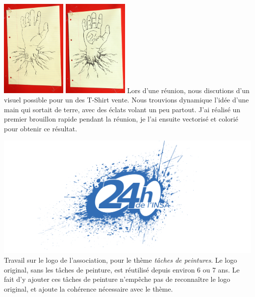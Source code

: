 \begin{center}
                \includegraphics[width=0.24\textwidth]{img/IMG_5792.JPG}
                \includegraphics[width=0.24\textwidth]{img/IMG_5848.JPG}
                Lors d'une réunion, nous discutions d'un visuel possible pour un des T-Shirt vente. Nous trouvions dynamique l'idée d'une main qui sortait de terre, avec des éclats volant un peu partout.
                J'ai réalisé un premier brouillon rapide pendant la réunion, je l'ai ensuite vectorisé et colorié pour obtenir ce résultat.
            \end{center}
            
            \begin{center}                     
                \includegraphics[width=\textwidth]{img/splash24.png}
                Travail sur le logo de l'association, pour le thème \textit{tâches de peintures}.
                Le logo original, sans les tâches de peinture, est réutilisé depuis environ 6 ou 7 ans.
                Le fait d'y ajouter ces tâches de peinture n'empêche pas de reconnaître le logo original, et ajoute la cohérence nécessaire avec le thème.
            \end{center}
                        
